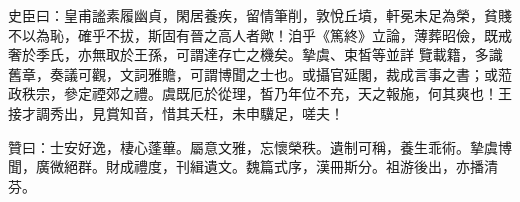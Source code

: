 \begin{pinyinscope}
 史臣曰：皇甫謐素履幽貞，閑居養疾，留情筆削，敦悅丘墳，軒冕未足為榮，貧賤不以為恥，確乎不拔，斯固有晉之高人者歟！洎乎《篤終》立論，薄葬昭儉，既戒奢於季氏，亦無取於王孫，可謂達存亡之機矣。摯虞、束皙等並詳
 覽載籍，多識舊章，奏議可觀，文詞雅贍，可謂博聞之士也。或攝官延閣，裁成言事之書；或蒞政秩宗，參定禋郊之禮。虞既厄於從理，皙乃年位不充，天之報施，何其爽也！王接才調秀出，見賞知音，惜其夭枉，未申驥足，嗟夫！



 贊曰：士安好逸，棲心蓬蓽。屬意文雅，忘懷榮秩。遺制可稱，養生乖術。摯虞博聞，廣微絕群。財成禮度，刊緝遺文。魏篇式序，漢冊斯分。祖游後出，亦播清芬。



\end{pinyinscope}